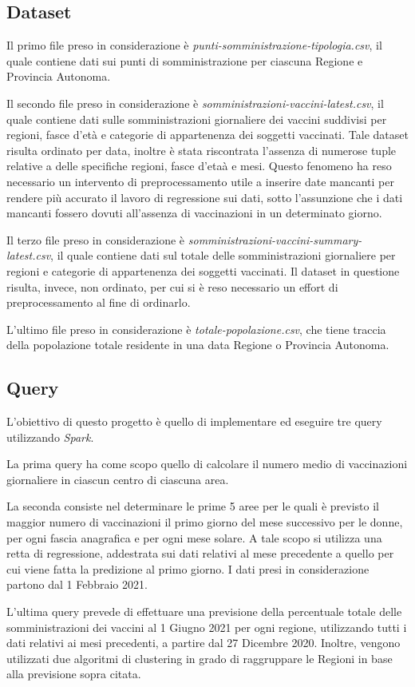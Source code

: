 \documentclass[conference]{IEEEtran}
\begin{document}
\subsection*{\textbf{Dataset}} 
Il primo file preso in considerazione \`{e} \textit{punti-somministrazione-tipologia.csv}, il quale contiene dati sui punti di somministrazione per ciascuna Regione e Provincia Autonoma.
\par Il secondo file preso in considerazione \`{e} \textit{somministrazioni-vaccini-latest.csv}, il quale contiene dati sulle somministrazioni giornaliere dei vaccini suddivisi per regioni, fasce d’et\`{a} e categorie di appartenenza dei soggetti vaccinati. Tale dataset risulta ordinato per data,
inoltre \`{e} stata riscontrata l'assenza di numerose tuple relative a delle specifiche regioni, fasce d'eta\`{a} e mesi. Questo fenomeno ha reso necessario un intervento di preprocessamento utile a inserire date mancanti per rendere pi\`{u} accurato il lavoro di regressione sui dati, sotto l'assunzione che i dati mancanti fossero dovuti all'assenza di vaccinazioni in un determinato giorno. 
\par Il terzo file preso in considerazione \`{e} \textit{somministrazioni-vaccini-summary-latest.csv}, il quale contiene dati sul totale delle somministrazioni giornaliere per regioni e categorie di appartenenza dei soggetti vaccinati. Il dataset in questione risulta, invece, non ordinato, per cui
si \`{e} reso necessario un effort di preprocessamento al fine di ordinarlo. 
\par L'ultimo file preso in considerazione \`{e} \textit{totale-popolazione.csv}, che tiene traccia
della popolazione totale residente in una data Regione o Provincia Autonoma.
\subsection*{\textbf{Query}}
L'obiettivo di questo progetto \`{e} quello di implementare ed eseguire tre query utilizzando \emph{Spark}.
\par La prima query ha come scopo quello di calcolare il numero medio di vaccinazioni giornaliere
in ciascun centro di ciascuna area.
\par La seconda consiste nel determinare le prime 5 aree per le quali è previsto il maggior numero di
vaccinazioni il primo giorno del mese successivo per le donne, per ogni fascia anagrafica e per ogni mese solare. A tale scopo si utilizza una retta di regressione, addestrata sui dati relativi al mese
precedente a quello per cui viene fatta la predizione al primo giorno. I dati presi in considerazione partono dal 1 Febbraio 2021.
\par L'ultima query prevede di effettuare una previsione della percentuale totale delle somministrazioni dei vaccini al 1 Giugno 2021 per ogni regione, utilizzando tutti i dati relativi ai mesi precedenti, a partire dal 27 Dicembre 2020. Inoltre, vengono utilizzati due algoritmi di
clustering in grado di raggruppare le Regioni in base alla previsione sopra citata.
\end{document}
